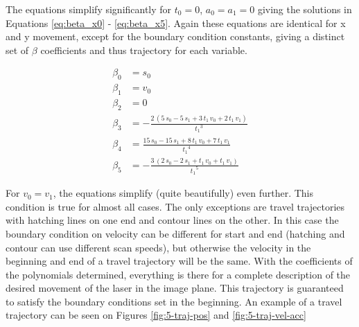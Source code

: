The equations simplify significantly for $t_0 = 0$, $a_{0} = a_{1} = 0$ giving the solutions in Equations \ref{eq:beta_x0} - \ref{eq:beta_x5}. Again these equations are identical for x and y movement, except for the boundary condition constants, giving a distinct set of $\beta$ coefficients and thus trajectory for each variable.

\begin{align}
    \beta_{0} &= s_{0} \label{eq:beta_x0} \\
    \beta_{1} &= v_{0} \\
    \beta_{2} &= 0 \\
    \beta_{3} &= -\frac{2\,{\left(5\,s_{\textrm{0}} -5\,s_{\textrm{1}} +3\,t_1 \,v_{\textrm{0}} +2\,t_1 \,v_{\textrm{1}} \right)}}{{t_1 }^3 } \\
    \beta_{4} &= \frac{15\,s_{\textrm{0}} -15\,s_{\textrm{1}} +8\,t_1 \,v_{\textrm{0}} +7\,t_1 \,v_{\textrm{1}} }{{t_1 }^4 } \\
    \beta_{5} &= -\frac{3\,{\left(2\,s_{\textrm{0}} -2\,s_{\textrm{1}} +t_1 \,v_{\textrm{0}} +t_1 \,v_{\textrm{1}} \right)}}{{t_1 }^5 } \label{eq:beta_x5}
\end{align}

For $v_{0}=v_{1}$, the equations simplify (quite beautifully) even further. This condition is true for almost all cases. The only exceptions are travel trajectories with hatching lines on one end and contour lines on the other. In this case the boundary condition on velocity can be different for start and end (hatching and contour can use different scan speeds), but otherwise the velocity in the beginning and end of a travel trajectory will be the same. With the coefficients of the polynomials determined, everything is there for a complete description of the desired movement of the laser in the image plane. This trajectory is guaranteed to satisfy the boundary conditions set in the beginning. An example of a travel trajectory can be seen on Figures \ref{fig:5-traj-pos} and \ref{fig:5-traj-vel-acc}

